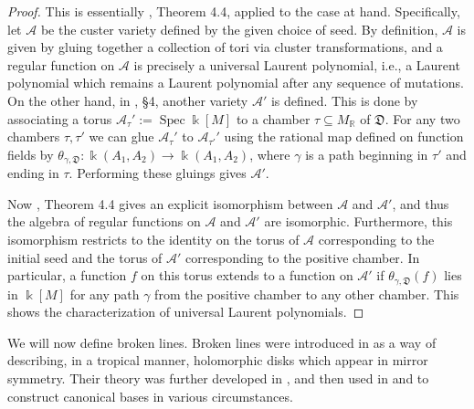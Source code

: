 \documentclass[11pt]{amsart}
\theoremstyle{remark}
\numberwithin{equation}{section}
\newcommand{\RR}{\mathbb{R}}
\newcommand{\cA}{\mathcal{A}}
\newcommand{\DD}{\mathfrak{D}}
\newcommand{\Spec}{\operatorname{Spec}}
\begin{document}
\begin{proof}
  This is essentially \cite{GHKK}, Theorem 4.4, applied to the case at hand.
  Specifically, let $\cA$ be the custer variety defined by the given choice of
  seed. By definition, $\cA$ is given by gluing together a collection of tori
  via cluster transformations, and a regular function on $\cA$ is precisely a
  universal Laurent polynomial, i.e., a Laurent polynomial which remains a
  Laurent polynomial after any sequence of mutations. On the other hand, in
  \cite{GHKK}, \S 4, another variety $\cA'$ is defined. This is done by
  associating a torus $\cA_{\tau}':= \Spec \Bbbk[M]$ to a chamber $\tau\subseteq
  M_{\RR}$ of $\DD$. For any two chambers $\tau,\tau'$ we can glue $\cA_{\tau}'$
  to $\cA_{\tau'}'$ using the rational map defined on function fields by
  $\theta_{\gamma,\DD}:\Bbbk(A_1,A_2)\rightarrow \Bbbk(A_1,A_2)$, where $\gamma$
  is a path beginning in $\tau'$ and ending in $\tau$. Performing these gluings
  gives $\cA'$.

  Now \cite{GHKK}, Theorem 4.4 gives an explicit isomorphism between $\cA$ and
  $\cA'$, and thus the algebra of regular functions on $\cA$ and $\cA'$ are
  isomorphic. Furthermore, this isomorphism restricts to the identity on the
  torus of $\cA$ corresponding to the initial seed and the torus of $\cA'$
  corresponding to the positive chamber. In particular, a function $f$ on this
  torus extends to a function on $\cA'$ if $\theta_{\gamma,\DD}(f)$ lies in
  $\Bbbk[M]$ for any path $\gamma$ from the positive chamber to any other
  chamber. This shows the characterization of universal Laurent polynomials.
\end{proof}

We will now define broken lines. Broken lines were introduced in \cite{G10} as a
way of describing, in a tropical manner,  holomorphic disks which appear in
mirror symmetry.  Their theory was further developed in \cite{CPS}, and then
used in \cite{GHK11} and \cite{GHKK} to construct canonical bases in various
circumstances.
\end{document}
